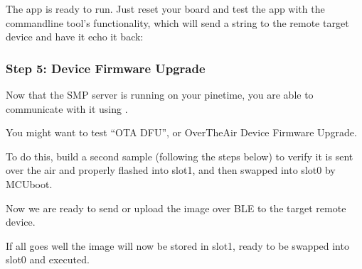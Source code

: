 \documentclass[letterpaper,10pt,english]{sphinxmanual}
\begin{document}
The  app is ready to run.  Just reset your board and test the app
with the  command\sphinxhyphen{}line tool’s  functionality, which will
send a string to the remote target device and have it echo it back:

\begin{sphinxVerbatim}[commandchars=\\\{\}]
\end{sphinxVerbatim}


\subsubsection{Step 5: Device Firmware Upgrade}
\label{\detokenize{fota/smp_svr:step-5-device-firmware-upgrade}}
Now that the SMP server is running on your pinetime, you are able to communicate
with it using .

You might want to test “OTA DFU”, or Over\sphinxhyphen{}The\sphinxhyphen{}Air Device Firmware Upgrade.

To do this, build a second sample (following the steps below) to verify
it is sent over the air and properly flashed into slot\sphinxhyphen{}1, and then
swapped into slot\sphinxhyphen{}0 by MCUboot.

\begin{sphinxVerbatim}[commandchars=\\\{\}]
    
    
     
\end{sphinxVerbatim}

Now we are ready to send or upload the image over BLE to the target remote
device.

\begin{sphinxVerbatim}[commandchars=\\\{\}]
\end{sphinxVerbatim}

If all goes well the image will now be stored in slot\sphinxhyphen{}1, ready to be swapped
into slot\sphinxhyphen{}0 and executed.
\end{document}
